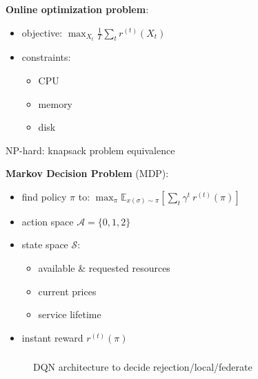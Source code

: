 \documentclass[aspectratio=169]{beamer}
\begin{document}
\begin{frame}
    \frametitle{\secname}
    \framesubtitle{\subsecname}


    \begin{minipage}{.45\textwidth}
        \textbf{Online optimization problem}:
        \begin{itemize}
            \item objective: $\max_{X_t} \frac{1}{T}\sum_t r^{(t)}(X_t)$
            \item constraints:
                \begin{itemize}
                    \item CPU
                    \item memory
                    \item disk
                \end{itemize}
        \end{itemize}
        NP-hard: knapsack problem equivalence
    \end{minipage}\pause
    \hfill
    \vline
    \hfill
    \begin{minipage}{.45\textwidth}
        \textbf{Markov Decision Problem} (MDP):
        \begin{itemize}
            \item find policy $\pi$ to: $\max_\pi \mathbb{E}_{x(\sigma)\sim\pi}\left[ \sum_t \gamma^{t}\ r^{(t)}(\pi) \right]$
            \item action space $\mathcal{A}=\{0,1,2\}$
            \item state space $\mathcal{S}$:
                \begin{itemize}
                    \item available \& requested resources
                    \item current prices
                    \item service lifetime
                \end{itemize}
            \item instant reward $r^{(t)}(\pi)$
        \end{itemize}
    \end{minipage}
    
\end{frame}







\begin{frame}
    \frametitle{\secname}
    \framesubtitle{\subsecname}

    \begin{figure}
        \centering
        
        \caption{DQN architecture to decide rejection/local/federate}
    \end{figure}
\end{frame}
\end{document}
